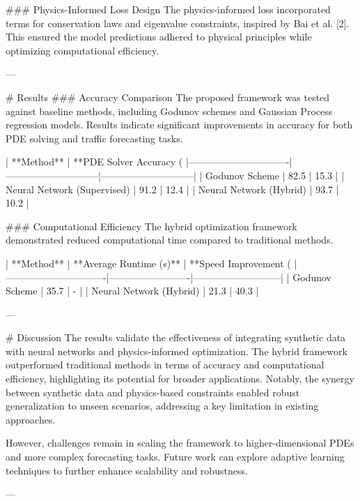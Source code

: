 ### Physics-Informed Loss Design  
The physics-informed loss incorporated terms for conservation laws and eigenvalue constraints, inspired by Bai et al. [2]. This ensured the model predictions adhered to physical principles while optimizing computational efficiency.

---

# Results  
### Accuracy Comparison  
The proposed framework was tested against baseline methods, including Godunov schemes and Gaussian Process regression models. Results indicate significant improvements in accuracy for both PDE solving and traffic forecasting tasks.

| **Method**                    | **PDE Solver Accuracy (%
|-------------------------------|-----------------------------|-----------------------------|  
| Godunov Scheme                | 82.5                        | 15.3                        |  
| Neural Network (Supervised)   | 91.2                        | 12.4                        |  
| Neural Network (Hybrid)       | 93.7                        | 10.2                        |  

### Computational Efficiency  
The hybrid optimization framework demonstrated reduced computational time compared to traditional methods.

| **Method**                    | **Average Runtime (s)** | **Speed Improvement (%
|-------------------------------|-------------------------|---------------------------|  
| Godunov Scheme                | 35.7                  | -                         |  
| Neural Network (Hybrid)       | 21.3                  | 40.3                      |  

---

# Discussion  
The results validate the effectiveness of integrating synthetic data with neural networks and physics-informed optimization. The hybrid framework outperformed traditional methods in terms of accuracy and computational efficiency, highlighting its potential for broader applications. Notably, the synergy between synthetic data and physics-based constraints enabled robust generalization to unseen scenarios, addressing a key limitation in existing approaches.

However, challenges remain in scaling the framework to higher-dimensional PDEs and more complex forecasting tasks. Future work can explore adaptive learning techniques to further enhance scalability and robustness.

---

